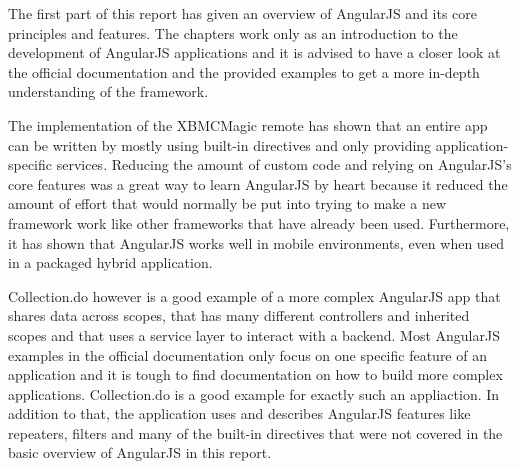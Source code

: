 The first part of this report has given an overview of AngularJS and its core principles and features. The chapters work only as an introduction to the development of AngularJS applications and it is advised to have a closer look at the official documentation and the provided examples to get a more in-depth understanding of the framework.

The implementation of the XBMCMagic remote has shown that an entire app can be written by mostly using built-in directives and only providing application-specific services. Reducing the amount of custom code and relying on AngularJS's core features was a great way to learn AngularJS by heart because it reduced the amount of effort that would normally be put into trying to make a new framework work like other frameworks that have already been used. Furthermore, it has shown that AngularJS works well in mobile environments, even when used in a packaged hybrid application.

Collection.do however is a good example of a more complex AngularJS app that shares data across scopes, that has many different controllers and inherited scopes and that uses a service layer to interact with a backend. Most AngularJS examples in the official documentation only focus on one specific feature of an application and it is tough to find documentation on how to build more complex applications. Collection.do is a good example for exactly such an appliaction. In addition to that, the application uses and describes AngularJS features like repeaters, filters and many of the built-in directives that were not covered in the basic overview of AngularJS in this report.